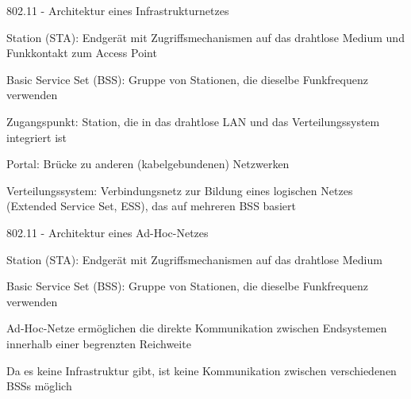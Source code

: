 \documentclass[a4paper]{article}
\begin{document}
\begin{multicols}{3}
      802.11 - Architektur eines Infrastrukturnetzes
      \begin{itemize*}
            \item Station (STA): Endgerät mit Zugriffsmechanismen auf das drahtlose Medium und Funkkontakt zum Access Point
            \item Basic Service Set (BSS): Gruppe von Stationen, die dieselbe Funkfrequenz verwenden
            \item Zugangspunkt: Station, die in das drahtlose LAN und das Verteilungssystem integriert ist
            \item Portal: Brücke zu anderen (kabelgebundenen) Netzwerken
            \item Verteilungssystem: Verbindungsnetz zur Bildung eines logischen Netzes (Extended Service Set, ESS), das auf mehreren BSS basiert
      \end{itemize*}

      802.11 - Architektur eines Ad-Hoc-Netzes
      \begin{itemize*}
            \item Station (STA): Endgerät mit Zugriffsmechanismen auf das drahtlose Medium
            \item Basic Service Set (BSS): Gruppe von Stationen, die dieselbe Funkfrequenz verwenden
            \item Ad-Hoc-Netze ermöglichen die direkte Kommunikation zwischen Endsystemen innerhalb einer begrenzten Reichweite
            \item Da es keine Infrastruktur gibt, ist keine Kommunikation zwischen verschiedenen BSSs möglich
      \end{itemize*}


\end{multicols}
\end{document}
